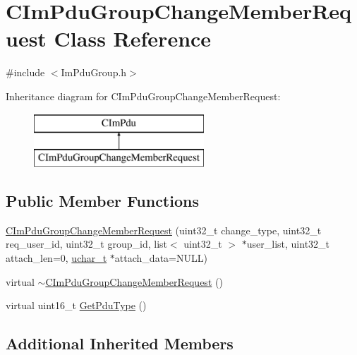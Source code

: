 \hypertarget{class_c_im_pdu_group_change_member_request}{}\section{C\+Im\+Pdu\+Group\+Change\+Member\+Request Class Reference}
\label{class_c_im_pdu_group_change_member_request}


{\ttfamily \#include $<$Im\+Pdu\+Group.\+h$>$}

Inheritance diagram for C\+Im\+Pdu\+Group\+Change\+Member\+Request\+:\begin{figure}[H]
\begin{center}
\leavevmode
\includegraphics[height=2.000000cm]{class_c_im_pdu_group_change_member_request}
\end{center}
\end{figure}
\subsection*{Public Member Functions}
\begin{DoxyCompactItemize}
\item 
\hyperlink{class_c_im_pdu_group_change_member_request_ac3da2bfbb124e5d772edb215e9973fa1}{C\+Im\+Pdu\+Group\+Change\+Member\+Request} (uint32\+\_\+t change\+\_\+type, uint32\+\_\+t req\+\_\+user\+\_\+id, uint32\+\_\+t group\+\_\+id, list$<$ uint32\+\_\+t $>$ $\ast$user\+\_\+list, uint32\+\_\+t attach\+\_\+len=0, \hyperlink{base_2ostype_8h_a124ea0f8f4a23a0a286b5582137f0b8d}{uchar\+\_\+t} $\ast$attach\+\_\+data=N\+U\+L\+L)
\item 
virtual \hyperlink{class_c_im_pdu_group_change_member_request_a6ee39686ac6cc46465b2804f4df9bf44}{$\sim$\+C\+Im\+Pdu\+Group\+Change\+Member\+Request} ()
\item 
virtual uint16\+\_\+t \hyperlink{class_c_im_pdu_group_change_member_request_a5ed197a5e3582480fc65c47085694296}{Get\+Pdu\+Type} ()
\end{DoxyCompactItemize}
\subsection*{Additional Inherited Members}


